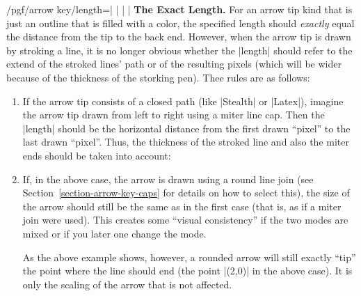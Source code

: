 \begin{key}{/pgf/arrow key/length=| |%
    | |}
  \medskip
  \noindent \textbf{The Exact Length.}
  For an arrow tip kind that is just an outline that is filled with a
  color, the specified length should \emph{exactly} equal the distance
  from the tip to the back end. However, when the arrow tip is drawn
  by stroking a line, it is no longer obvious whether the |length|
  should refer to the extend of the stroked lines' path or of the
  resulting pixels (which will be wider because of the thickness of
  the storking pen). Thee rules are as follows:
  \begin{enumerate}
  \item If the arrow tip consists of a closed path (like |Stealth| or
    |Latex|), imagine the arrow tip drawn from left to right using a
    miter line cap. Then the |length| should be the horizontal
    distance from the first drawn ``pixel'' to the last drawn
    ``pixel''. Thus, the thickness of the stroked line and also the
    miter ends should be taken into account:
\begin{codeexample}[]
\end{codeexample}
  \item If, in the above case, the arrow is drawn using a round line
    join (see Section~\ref{section-arrow-key-caps} for details on how
    to select this), the size of the arrow should still be the same as
    in the first case (that is, as if a miter join were used). This
    creates some ``visual consistency'' if the two modes are mixed or
    if you later one change the mode.
\begin{codeexample}[]
\end{codeexample}
    As the above example shows, however, a rounded arrow will still
    exactly ``tip'' the point where the line should end (the point
    |(2,0)| in the above case). It is only the scaling of the arrow
    that is not affected.
  \end{enumerate}
\end{key}

